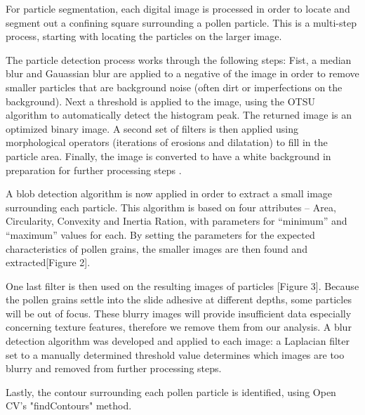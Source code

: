 For particle segmentation, each digital image is processed in order to locate and segment out a confining square surrounding a pollen particle. This is a multi-step process, starting with locating the particles on the larger image.

The particle detection process works through the following steps: Fist, a median blur and Gauassian blur are applied to a negative of the image in order to remove smaller particles that are background noise (often dirt or imperfections on the background). 
Next a threshold is applied to the image, using the OTSU algorithm to automatically detect the histogram peak. The returned image is an optimized binary image. A second set of filters is then applied using morphological operators (iterations of erosions and dilatation) to fill in the particle area. Finally, the image is converted to have a white background in preparation for further processing steps .

A blob detection algorithm is now applied in order to extract a small image surrounding each particle. This algorithm is based on four attributes – Area, Circularity, Convexity and Inertia Ration, with parameters for “minimum” and “maximum” values for each. By setting the parameters for the expected characteristics of pollen grains, the smaller images are then found and extracted[Figure 2].

One last filter is then used on the resulting images of particles [Figure 3]. Because the pollen grains settle into the slide adhesive at different depths, some particles will be out of focus. These blurry images will provide insufficient data especially concerning texture features, therefore we remove them from our analysis. A blur detection algorithm was developed and applied to each image: a Laplacian filter set to a manually determined threshold value determines which images are too blurry and removed from further processing steps. 

Lastly, the contour surrounding each pollen particle is identified, using Open CV's "findContours" method. 

    
    
    
    
  
  
  
  
  
  
  